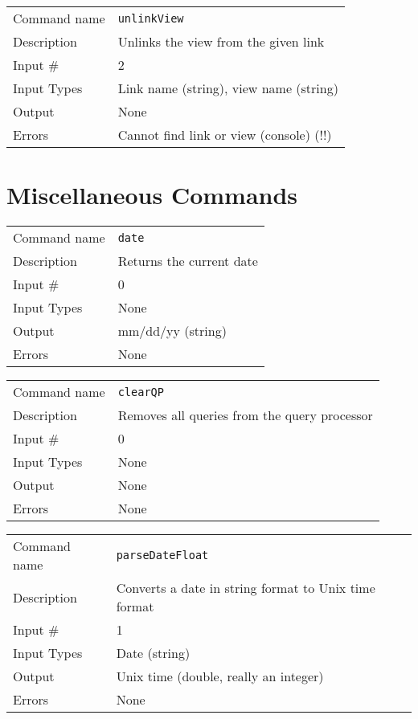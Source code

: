 \bigskip

\noindent
\begin{tabular}{l|p{5in}}
\hline
Command name & {\tt unlinkView} \\
Description  & Unlinks the view from the given link \\
Input \#     & 2 \\
Input Types  & Link name (string), view name (string) \\
Output       & None \\
Errors       & Cannot find link or view (console) (!!) \\
\hline
\end{tabular}

\section{Miscellaneous Commands}

\noindent
\begin{tabular}{l|p{5in}}
\hline
Command name & {\tt date} \\
Description  & Returns the current date \\
Input \#     & 0 \\
Input Types  & None \\
Output       & mm/dd/yy (string) \\
Errors       & None \\
\hline
\end{tabular}

\bigskip

\noindent
\begin{tabular}{l|p{5in}}
\hline
Command name & {\tt clearQP} \\
Description  & Removes all queries from the query processor \\
Input \#     & 0 \\
Input Types  & None \\
Output       & None \\
Errors       & None \\
\hline
\end{tabular}

\bigskip

\noindent
\begin{tabular}{l|p{5in}}
\hline
Command name & {\tt parseDateFloat} \\
Description  & Converts a date in string format to Unix time format \\
Input \#     & 1 \\
Input Types  & Date (string) \\
Output       & Unix time (double, really an integer) \\
Errors       & None \\
\hline
\end{tabular}

